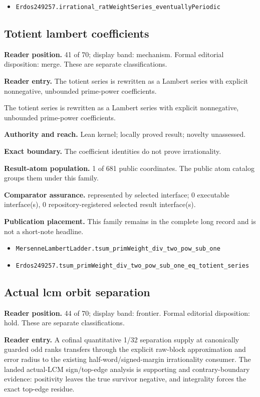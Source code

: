 \begin{itemize}
  \item \nolinkurl{Erdos249257.irrational_ratWeightSeries_eventuallyPeriodic}
\end{itemize}

\subsection{Totient lambert coefficients}
\textbf{Reader position.} 41 of 70; display band: mechanism.  Formal editorial disposition: merge.  These are separate classifications.

\textbf{Reader entry.} The totient series is rewritten as a Lambert series with explicit nonnegative, unbounded prime-power coefficients.

The totient series is rewritten as a Lambert series with explicit nonnegative, unbounded prime-power coefficients.

\textbf{Authority and reach.} Lean kernel; locally proved result; novelty unassessed.

\textbf{Exact boundary.} The coefficient identities do not prove irrationality.

\textbf{Result-atom population.} 1 of 681 public coordinates. The public atom catalog groups them under this family.

\textbf{Comparator assurance.} represented by selected interface; 0 executable interface(s), 0 repository-registered selected result interface(s).

\textbf{Publication placement.} This family remains in the complete long record and is not a short-note headline.

\begin{itemize}
  \item \nolinkurl{MersenneLambertLadder.tsum_primWeight_div_two_pow_sub_one}
  \item \nolinkurl{Erdos249257.tsum_primWeight_div_two_pow_sub_one_eq_totient_series}
\end{itemize}

\subsection{Actual lcm orbit separation}
\textbf{Reader position.} 44 of 70; display band: frontier.  Formal editorial disposition: hold.  These are separate classifications.

\textbf{Reader entry.} A cofinal quantitative 1/32 separation supply at canonically guarded odd ranks transfers through the explicit raw-block approximation and error radius to the existing half-word/signed-margin irrationality consumer. The landed actual-LCM sign/top-edge analysis is supporting and contrary-boundary evidence: positivity leaves the true survivor negative, and integrality forces the exact top-edge residue.

